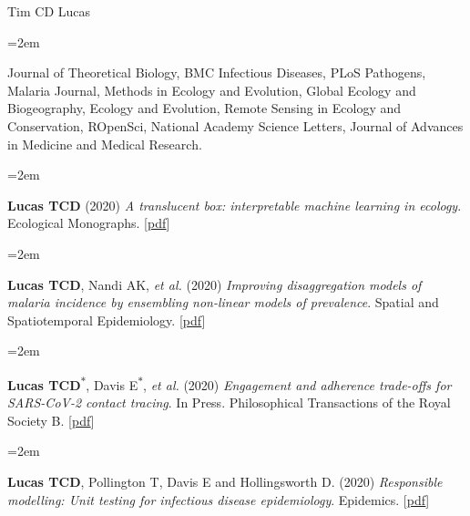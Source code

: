 \documentclass{scrartcl}
\newcommand{\MarginText}[1]{\marginpar{\raggedleft\itshape\small#1}} %
\newcommand{\Description}[1]{\hangindent=2em\hangafter=0\noindent\raggedright\footnotesize{#1}\par\normalsize\vspace{1em}} %
\begin{document}
\begin{cv}{Tim {\Large CD} Lucas}
\vspace{-0.5em} %


\Description{Journal of Theoretical Biology, BMC Infectious Diseases, PLoS Pathogens, Malaria Journal, Methods in Ecology and Evolution, Global Ecology and Biogeography, Ecology and Evolution, Remote Sensing in Ecology and Conservation, ROpenSci, National Academy Science Letters, Journal of Advances in Medicine and Medical Research.}




\vspace{1em} %

{\color{Maroon}}\vspace{1em}



\Description{\MarginText{2020}\textbf{Lucas TCD} (2020) \emph{A translucent box: interpretable machine learning in ecology}. Ecological Monographs. [\href{https://esajournals.onlinelibrary.wiley.com/doi/epdf/10.1002/ecm.1422}{pdf}]}


\Description{\textbf{Lucas TCD}, Nandi AK,  \emph{et al.} (2020) \emph{ Improving disaggregation models of malaria incidence by ensembling non-linear models of prevalence}. Spatial and Spatiotemporal Epidemiology. [\href{https://reader.elsevier.com/reader/sd/pii/S1877584520300356?token=A7B0EF0114C0A057AD7F1E13B7F97FE4D359B945C1F09211AC50B77D272216014E3E9881E3FBFC7D3CA8A8DD5A78846A}{pdf}]}

\Description{\textbf{Lucas TCD}\textsuperscript{$\ast$}, Davis E\textsuperscript{$\ast$}, \emph{et al.} (2020) \emph{Engagement and adherence trade-offs for SARS-CoV-2 contact tracing}. In Press. Philosophical Transactions of the Royal Society B. [\href{https://eprints.soton.ac.uk/445257/1/2020.08.20.20178558v1.full.pdf}{pdf}]}


\Description{\textbf{Lucas TCD}, Pollington T, Davis E and Hollingsworth D. (2020) \emph{Responsible modelling: Unit testing for infectious disease epidemiology}. Epidemics. [\href{https://www.sciencedirect.com/science/article/pii/S1755436520300451}{pdf}]}




\end{cv}
\end{document}

